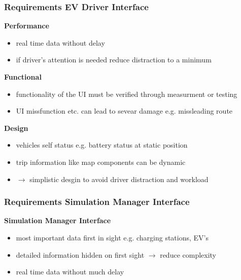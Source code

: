 \begin{frame}
	\frametitle{Requirements EV Driver Interface}

	\begin{PraesentationAufzaehlung}

		\item \textbf{Performance}
		\begin{itemize}
			\item real time data without delay
			\item if driver's attention is needed reduce distraction to a minimum
		\end{itemize}

		\item \textbf{Functional}
		\begin{itemize}
			\item functionality of the UI must be verified through measurment or testing
			\item UI missfunction etc. can lead to sevear damage e.g. missleading route
		\end{itemize}

		\item \textbf{Design}
		\begin{itemize}
			\item vehicles self status e.g. battery status at static position
			\item trip information like map components can be dynamic
			\item $\rightarrow$ simplistic desgin to avoid driver distraction and workload
		\end{itemize}

	\end{PraesentationAufzaehlung}
\end{frame}
\clearpage



\begin{frame}
	\frametitle{Requirements Simulation Manager Interface}

	\begin{PraesentationAufzaehlung}

		\item \textbf{Simulation Manager Interface}
		\begin{itemize}
			\item most important data first in sight e.g. charging stations, EV's
			\item detailed information hidden on first sight $\rightarrow$ reduce complexity
			\item real time data without much delay
		\end{itemize}

	\end{PraesentationAufzaehlung}

\end{frame}
\clearpage



